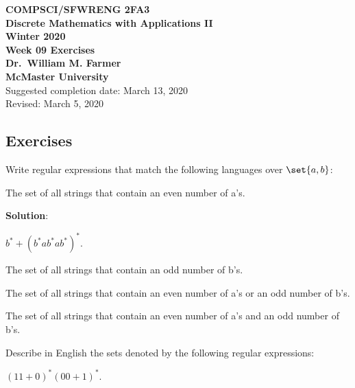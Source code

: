 \documentclass[11pt,fleqn]{article}
\begin{document}
\bc

  {\large \textbf{COMPSCI/SFWRENG 2FA3}}\\[2mm]
  {\large \textbf{Discrete Mathematics with Applications II}}\\[2mm]
  {\large \textbf{Winter 2020}}\\[8mm]
  {\huge \textbf{Week 09 Exercises}}\\[6mm]
  {\large \textbf{Dr.~William M. Farmer}}\\[2mm]
  {\large \textbf{McMaster University}}\\[6mm]
  {\large Suggested completion date: March 13, 2020}\\[2mm]
  {\large Revised: March 5, 2020}

\ec

\medskip

\subsection*{Exercises}

\be

  \item Write regular expressions that match the following languages
    over $\set{a,b}$:
  
  \be

    \item The set of all strings that contain an even number of a's.

\medskip

\textbf{Solution}:

\medskip

$b^* + (b^*ab^*ab^*)^*.$

\medskip

    \item The set of all strings that contain an odd number of b's.

    \item The set of all strings that contain an even number of a's or
      an odd number of b's.

    \item The set of all strings that contain an even number of a's
      and an odd number of b's.

  \ee

  \item Describe in English the sets denoted by the following regular
    expressions:

  \be

    \item $(11 + 0)^*(00 + 1)^*$.
\end{document}
